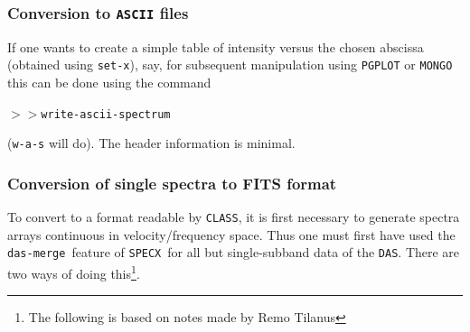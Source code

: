 \documentclass[11pt,twoside]{article}
\newcommand{\SPECX}{{\tt SPECX}}
\newcommand{\dm}{{\tt das-merge}}
\newcommand{\SP}{{$>\!>$}}
\begin{document}
\subsubsection{Conversion to {\tt ASCII} files}
\label{sec:specx2ascii}
If one wants to create a simple table of intensity versus the chosen
abscissa (obtained using {\tt set-x}), say, for subsequent
manipulation using {\tt PGPLOT} or {\tt MONGO} this can be done using
the command

\SP \verb|write-ascii-spectrum|

({\tt{w-a-s}} will do). The header information is minimal.

\subsubsection{Conversion of single spectra to FITS format}
\label{sec:specx2fits}
To convert to a format readable by {\tt CLASS}, it is first necessary
to generate spectra arrays continuous in velocity/frequency
space. Thus one must first have used the \dm\ feature of \SPECX\ for
all but single-subband data of the {\tt DAS}. There are two ways of
doing this\footnote{The following is based on notes made by Remo
Tilanus}.
\end{document}
